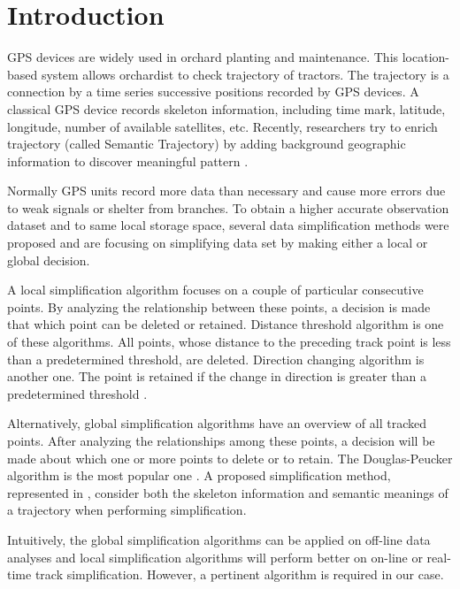 


\section{Introduction}

GPS devices are widely used in orchard planting and maintenance. This location-based system allows orchardist to check trajectory of tractors. The trajectory is a connection by a time series successive positions recorded by GPS devices. A classical GPS device records skeleton information, including time mark, latitude, longitude, number of available satellites, etc. Recently, researchers try to enrich trajectory (called Semantic Trajectory) by adding background geographic information to discover meaningful pattern \cite{ying2011semantic}. 


Normally GPS units record more data than necessary and cause more errors due to weak signals or shelter from branches. To obtain a higher accurate observation dataset and to same local storage space, several data simplification methods were proposed and are focusing on simplifying data set by making either a local or global decision. 

A local simplification algorithm focuses on a couple of particular consecutive points. By analyzing the relationship between these points, a decision is made that which point can be deleted or retained. Distance threshold algorithm is one of these algorithms. All points, whose distance to the preceding track point is less than a predetermined threshold, are deleted. Direction changing algorithm is another one. The point is retained if the change in direction is greater than a predetermined threshold  \cite{ivanov2012real}. 

Alternatively, global simplification algorithms have an overview of all tracked points. After analyzing the relationships among these points, a decision will be made about which one or more points to delete or to retain. The Douglas-Peucker algorithm is the most popular one  \cite{douglas1973algorithms}. A proposed simplification method, represented in \cite{chen2009trajectory}, consider both the skeleton information and semantic meanings of a trajectory when performing simplification. 


Intuitively, the global simplification algorithms can be applied on off-line data analyses and local simplification algorithms will perform better on on-line or real-time track simplification. However, a pertinent algorithm is required in our case. 



